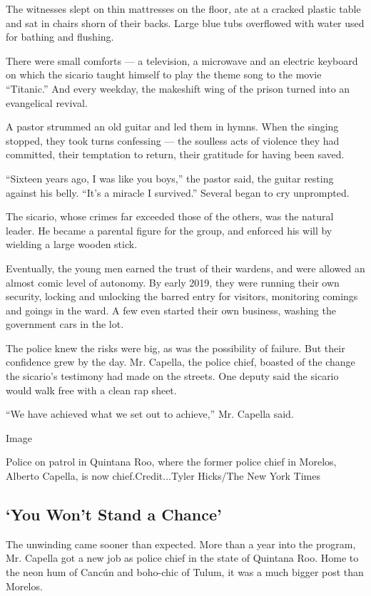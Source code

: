 The witnesses slept on thin mattresses on the floor, ate at a cracked
plastic table and sat in chairs shorn of their backs. Large blue tubs
overflowed with water used for bathing and flushing.

There were small comforts --- a television, a microwave and an electric
keyboard on which the sicario taught himself to play the theme song to
the movie ``Titanic.'' And every weekday, the makeshift wing of the
prison turned into an evangelical revival.

A pastor strummed an old guitar and led them in hymns. When the singing
stopped, they took turns confessing --- the soulless acts of violence
they had committed, their temptation to return, their gratitude for
having been saved.

``Sixteen years ago, I was like you boys,'' the pastor said, the guitar
resting against his belly. ``It's a miracle I survived.'' Several began
to cry unprompted.

The sicario, whose crimes far exceeded those of the others, was the
natural leader. He became a parental figure for the group, and enforced
his will by wielding a large wooden stick.

Eventually, the young men earned the trust of their wardens, and were
allowed an almost comic level of autonomy. By early 2019, they were
running their own security, locking and unlocking the barred entry for
visitors, monitoring comings and goings in the ward. A few even started
their own business, washing the government cars in the lot.

The police knew the risks were big, as was the possibility of failure.
But their confidence grew by the day. Mr. Capella, the police chief,
boasted of the change the sicario's testimony had made on the streets.
One deputy said the sicario would walk free with a clean rap sheet.

``We have achieved what we set out to achieve,'' Mr. Capella said.

Image

Police on patrol in Quintana Roo, where the former police chief in
Morelos, Alberto Capella, is now chief.Credit...Tyler Hicks/The New York
Times

\hypertarget{you-wont-stand-a-chance}{%
\subsection{`You Won't Stand a Chance'}\label{you-wont-stand-a-chance}}

The unwinding came sooner than expected. More than a year into the
program, Mr. Capella got a new job as police chief in the state of
Quintana Roo. Home to the neon hum of Cancún and boho-chic of Tulum, it
was a much bigger post than Morelos.

